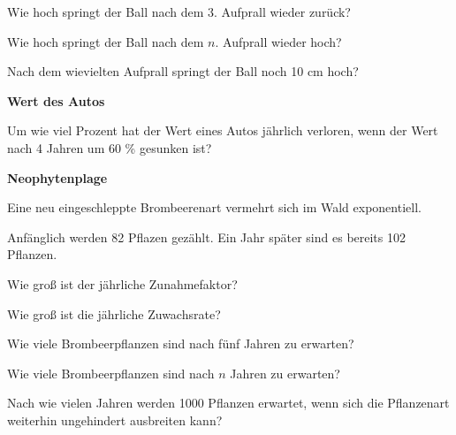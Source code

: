 \begin{bbwAufgabenBlock}

\item Wie hoch springt der Ball nach dem 3. Aufprall wieder zurück?
\item Wie hoch springt der Ball nach dem $n$. Aufprall wieder hoch?
\item Nach dem wievielten Aufprall springt der Ball noch 10 cm hoch?
\end{bbwAufgabenBlock}
\platzFuerBerechnungenBisEndeSeite{}



\bbwActAufgabenNr{} \textbf{Wert des Autos}

Um wie viel Prozent hat der Wert eines Autos jährlich verloren, wenn
der Wert nach 4 Jahren um 60 \% gesunken ist?
\nextBbwAufgabenNummer%
\platzFuerBerechnungenBisEndeSeite{}








\bbwActAufgabenNr{} \textbf{Neophytenplage}

Eine neu eingeschleppte Brombeerenart vermehrt sich im Wald exponentiell.

Anfänglich werden 82 Pflazen gezählt. Ein Jahr später sind es bereits 102 Pflanzen.

\begin{bbwAufgabenBlock}

\item Wie groß ist der jährliche Zunahmefaktor?
\item Wie groß ist die jährliche Zuwachsrate?
      
\item Wie viele Brombeerpflanzen sind nach fünf Jahren zu erwarten?

\item Wie viele Brombeerpflanzen sind nach $n$ Jahren zu erwarten?
\item Nach wie vielen Jahren werden 1000 Pflanzen erwartet, wenn sich die Pflanzenart weiterhin ungehindert ausbreiten kann?
\end{bbwAufgabenBlock}
\platzFuerBerechnungenBisEndeSeite{}



